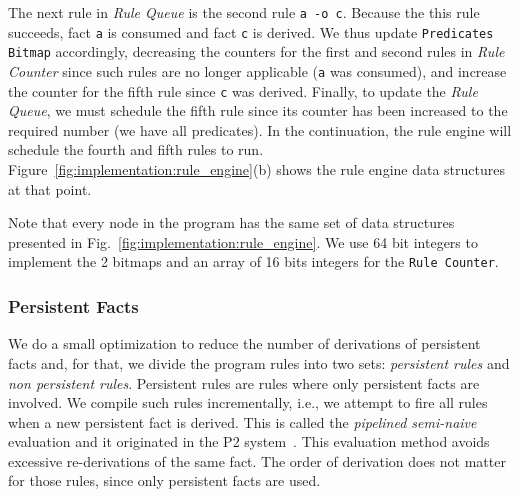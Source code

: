 The next rule in \emph{Rule Queue} is the second rule \texttt{a -o c}.
Because the this rule succeeds, fact \texttt{a} is consumed and fact \texttt{c}
is derived. We thus update \texttt{Predicates Bitmap} accordingly, decreasing
the counters for the first and second rules in \emph{Rule Counter} since such
rules are no longer applicable (\texttt{a} was consumed), and increase the
counter for the fifth rule since \texttt{c} was derived. Finally, to update the
\emph{Rule Queue}, we must schedule the fifth rule since its counter has been
increased to the required number (we have all predicates).  In the continuation,
the rule engine will schedule the fourth and fifth rules to run.
Figure~\ref{fig:implementation:rule_engine}(b) shows the rule engine data
structures at that point.

Note that every node in the program has the same set of data structures
presented in Fig.~\ref{fig:implementation:rule_engine}. We use 64 bit integers
to implement the 2 bitmaps and an array of 16 bits integers for the \texttt{Rule
Counter}.

\subsubsection{Persistent Facts}

We do a small optimization to reduce the number of derivations of persistent
facts and, for that, we divide the program rules into two sets: \emph{persistent
rules} and \emph{non persistent rules}. Persistent rules are rules where only
persistent facts are involved. We compile such rules incrementally, i.e., we
attempt to fire all rules when a new persistent fact is derived. This is called
the \emph{pipelined semi-naive} evaluation and it originated in the P2
system~\cite{Loo-condie-garofalakis-p2}. This evaluation method avoids excessive
re-derivations of the same fact. The order of derivation does not matter for
those rules, since only persistent facts are used.

